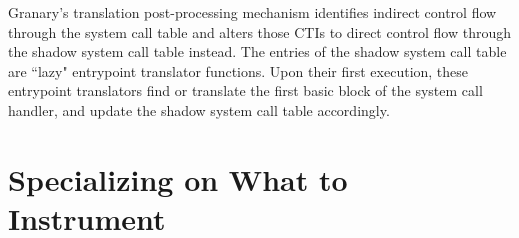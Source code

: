 \documentclass[preprint]{sigplanconf}
\begin{document}

Granary's translation post-processing mechanism identifies indirect control flow through the system call table and alters those CTIs to direct control flow through the shadow system call table instead. The entries of the shadow system call table are ``lazy" entrypoint translator functions. Upon their first execution, these entrypoint translators find or translate the first basic block of the system call handler, and update the shadow system call table accordingly. 





\section{Specializing on What to Instrument}
\end{document}
